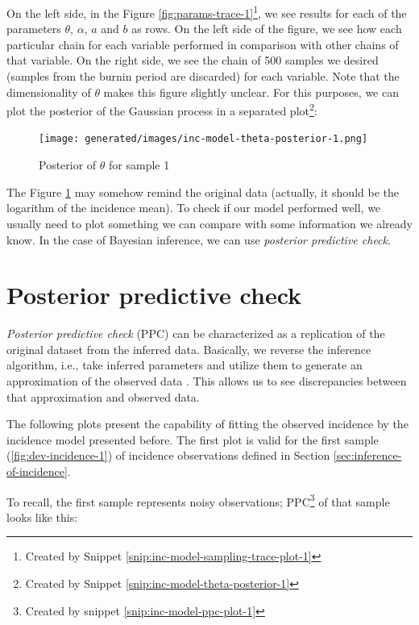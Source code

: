 \documentclass[
  digital, %
  oneside, %
  lof,     %
  lot,     %
]{fithesis4}
\begin{document}
On the left side, in the Figure \ref{fig:params-trace-1}\footnote{Created by Snippet \ref{snip:inc-model-sampling-trace-plot-1}}, we see results for each of the parameters $\theta$, $\alpha$, $a$ and $b$ as rows.
On the left side of the figure, we see how each particular chain for each variable performed in comparison with other chains of that variable.
On the right side, we see the chain of 500 samples we desired (samples from the burnin period are discarded) for each variable.
Note that the dimensionality of $\theta$ makes this figure slightly unclear.
For this purposes, we can plot the posterior of the Gaussian process in a separated plot\footnote{Created by Snippet \ref{snip:inc-model-theta-posterior-1}}:

\begin{figure}[H]
  \begin{center}
    \texttt{[image: generated/images/inc-model-theta-posterior-1.png]}
  \end{center}
  \caption{Posterior of $\theta$ for sample 1}
  \label{fig:theta-posterior-1}
\end{figure}

The Figure \ref{fig:theta-posterior-1} may somehow remind the original data (actually, it should be the logarithm of the incidence mean).
To check if our model performed well, we usually need to plot something we can compare with some information we already know.
In the case of Bayesian inference, we can use \textit{posterior predictive check}.


\section{Posterior predictive check}

\textit{Posterior predictive check} (PPC) can be characterized as a replication of the original dataset from the inferred data. 
Basically, we reverse the inference algorithm, i.e., take inferred parameters and utilize them to generate an approximation of the observed data \cite{davidson-pilon2015}.
This allows us to see discrepancies between that approximation and observed data.

The following plots present the capability of fitting the observed incidence by the incidence model presented before.
The first plot is valid for the first sample (\ref{fig:dev-incidence-1}) of incidence observations defined in Section \ref{sec:inference-of-incidence}.

\newpage
To recall, the first sample represents noisy observations; PPC\footnote{Created by snippet \ref{snip:inc-model-ppc-plot-1}} of that sample looks like this:
\end{document}
